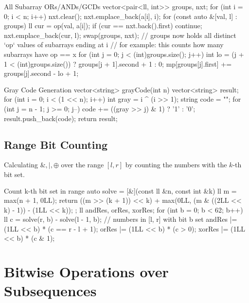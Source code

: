 \documentclass[10pt]{article}
\newcommand{\complexity}[1]{%
  \tcbox[on line,
    colback=tagbg,
    colframe=tagbg,
    boxrule=0pt,
    arc=2pt,
    boxsep=0pt,
    left=3.5pt, right=3.5pt, top=1.5pt, bottom=1.5pt
  ]{\color{tagtext}\scriptsize\bfseries\ensuremath{#1}}%
}
\begin{document}
\begin{vscode}{All Subarray ORs/ANDs/GCDs \complexity{O(N \log (\max A))}}
vector<pair<ll, int>> groups, nxt;
for (int i = 0; i < n; i++)
{
    nxt.clear();
    nxt.emplace_back(a[i], i);
    for (const auto &[val, l] : groups)
    {
        ll cur = op(val, a[i]);
        if (cur == nxt.back().first)
            continue;
        nxt.emplace_back(cur, l);
    }
    swap(groups, nxt);
    // groups now holds all distinct `op` values of subarrays ending at i
    // for example: this counts how many subarrays have op == x
    for (int j = 0; j < (int)groups.size(); j++)
    {
        int lo = (j + 1 < (int)groups.size()) ? groups[j + 1].second + 1 : 0;
        mp[groups[j].first] += groups[j].second - lo + 1;
    }
}
\end{vscode}

\begin{vscode}{Gray Code Generation \complexity{O(N \cdot 2^N)}}
vector<string> grayCode(int n)
{
    vector<string> result;
    for (int i = 0; i < (1 << n); i++)
    {
        int gray = i ^ (i >> 1);
        string code = "";
        for (int j = n - 1; j >= 0; j--)
            code += ((gray >> j) & 1) ? '1' : '0';
        result.push_back(code);
    }
    return result;
}
\end{vscode}

\subsection{Range Bit Counting}
Calculating $\&, |, \oplus$ over the range $[l, r]$ by counting the numbers with the $k$-th bit set.

\begin{vscode}{Count k-th bit set in range \complexity{O(\log(\max A))}}
auto solve = [&](const ll &n, const int &k)
{
    ll m = max(n + 1, 0LL);
    return ((m >> (k + 1)) << k) + max(0LL, (m & ((2LL << k) - 1)) - (1LL << k));
};
ll andRes{}, orRes{}, xorRes{};
for (int b = 0; b < 62; b++)
{
    ll c = solve(r, b) - solve(l - 1, b); // numbers in [l, r] with bit b set
    andRes |= (1LL << b) * (c == r - l + 1);
    orRes  |= (1LL << b) * (c > 0);
    xorRes |= (1LL << b) * (c & 1);
}
\end{vscode}

\newpage
\section{Bitwise Operations over Subsequences}
\label{sec:subseq}
\end{document}
